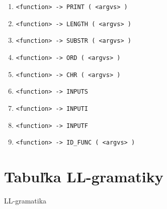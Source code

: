 \documentclass [11pt, a4paper]{article}
\begin{document}
\begin{table}[H]
\begin{enumerate}[noitemsep]
        \item \verb|<function> -> PRINT ( <argvs> )|
        \item \verb|<function> -> LENGTH ( <argvs> )|
        \item \verb|<function> -> SUBSTR ( <argvs> )|
        \item \verb|<function> -> ORD ( <argvs> )|
        \item \verb|<function> -> CHR ( <argvs> )|
        \item \verb|<function> -> INPUTS|
        \item \verb|<function> -> INPUTI|
        \item \verb|<function> -> INPUTF|
        \item \verb|<function> -> ID_FUNC ( <argvs> )|
	\end{enumerate}
\end{table}

\section{Tabuľka LL-gramatiky}
\begin{table}[H]
\centering
{}
\caption{LL-gramatika}
\end{table}
\end{document}
